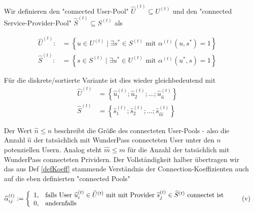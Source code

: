 \begin{Def}\label{defPools}

Wir definieren den "connected User-Pool" $\widehat{U}^{(t)} \subseteq U^{(t)}$ und den "connected Service-Provider-Pool" $\widehat{S}^{(t)} \subseteq S^{(t)}$ als

\begin{align}
\widehat{U}^{(t)}:&= \left\{u \in U^{(t)} \mid \exists s^{*} \in S^{(t)} \textrm{ mit } \alpha^{(t)}(u, s^{*}) = 1 \right\} \tag{i} \\ 
\widehat{S}^{(t)}:&= \left\{s \in S^{(t)} \mid \exists u^{*} \in U^{(t)} \textrm{ mit } \alpha^{(t)}(u^{*}, s) = 1 \right\} \tag{ii}
\end{align}

\vspace{0.3cm}

Für die diskrete/sortierte Variante ist dies wieder gleichbedeutend mit
\begin{align}
\widehat{U}^{(t)} &= \left\{ \widehat{u}^{(t)}_1; \widehat{u}^{(t)}_2;...; \widehat{u}^{(t)}_{\widehat{n}} \right\} \tag{iii} \\ 
\widehat{S}^{(t)} &= \left\{ \widehat{s}^{(t)}_1; \widehat{s}^{(t)}_2;...; \widehat{s}^{(t)}_{\widehat{m}}\right\} \tag{iv}
\end{align}

\vspace{0.6cm}

Der Wert $\widehat{n} \leq n$ beschreibt die Größe des connecteten User-Pools - also die Anzahl $\widehat{n}$ der tatsächlich mit WunderPass connecteten User unter den $n$ potenziellen Usern. Analog steht $\widehat{m} \leq m$ für die Anzahl der tatsächlich mit WunderPass connecteten Prividern. Der Vollständigkeit halber übertragen wir das aus Def \ref{defKoeff} stammende Verständnis der Connection-Koeffizienten auch auf die eben definierten "connected Pools"

\[
\widehat{\alpha}^{(t)}_{ij}:=\left\{%
\begin{array}{ll}
    1, & \hbox{falls User $\widehat{u}^{(t)}_i \in \widehat{U}^{(t)}$ mit mit Provider $\widehat{s}^{(t)}_j \in \widehat{S}^{(t)}$ connectet ist} \\
    0, & \hbox{andernfalls} \\
\end{array}%
\right. \tag{v}
\] 

\end{Def}

\vspace{0.6cm}

